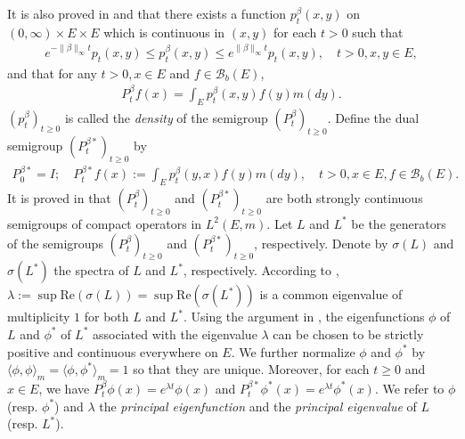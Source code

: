 \documentclass[12pt,a4paper]{amsart}
\theoremstyle{definition}
\numberwithin{equation}{section}
\begin{document}
It is also proved in \cite{RenSongZhang2015Limit} and \cite{RenSongZhang2017Central} that there exists a function $p^\beta_t(x,y)$ on $(0,\infty) \times E \times E$ which is continuous in $(x,y)$ for each $t>0$ such that 
\begin{align}
	e^{-\|\beta\|_\infty t} p_t(x,y)
	\leq p^{\beta}_t(x,y)
	\leq e^{\|\beta\|_\infty t} p_t(x,y),
	\quad t>0, x, y\in E,
\end{align}
and that for any $t>0, x\in E$ and $f \in \mathscr B_b(E)$,
\begin{align}
	P^\beta_t f(x)
	= \int_E p_t^\beta (x,y) f(y) m(dy).
\end{align}
$(p^\beta_t)_{t\geq 0}$ is called the
\emph{density}  of the semigroup $(P^\beta_t)_{t\geq 0}$.
Define the dual semigroup $(P^{\beta *}_t)_{t \geq 0}$ by
\begin{align}
	P^{\beta *}_0 = I;
	\quad P^{\beta *}_t f(x)
	:= \int_E p^\beta_t (y,x) f(y) m(dy),
	\quad t>0, x\in E, f\in \mathscr B_b(E).
\end{align}
It is proved in \cite{RenSongZhang2015Limit, RenSongZhang2017Central} that $(P^\beta_t)_{t \geq 0}$ and $(P^{\beta *}_t)_{t \geq 0}$ are both strongly continuous semigroups of compact operators in $L^2(E,m)$.
Let $L$ and $L^*$ be the generators of the semigroups $(P^\beta_t)_{t \geq 0}$ and $(P^{\beta *}_t)_{t \geq 0}$, respectively.
Denote by $\sigma(L)$ and $\sigma(L^*)$ the spectra of $L$ and $L^*$, respectively.
According to \cite[Theorem V.6.6]{Schaefer1974Banach}, $\lambda := \sup \text{Re}(\sigma(L)) = \sup \text{Re}(\sigma(L^*))$ is a common eigenvalue of multiplicity $1$ for both $L$ and $L^*$.
Using the argument in \cite{RenSongZhang2015Limit}, the eigenfunctions $\phi$ of $L$ and $\phi^*$ of $L^*$ associated with the eigenvalue $\lambda$ can be chosen to be strictly positive and continuous everywhere on $E$.
We further normalize $\phi$ and $\phi^*$ by $\langle\phi, \phi\rangle_m = \langle\phi,\phi^*\rangle_m = 1$ so that they are unique.
Moreover, for each $t\geq 0$ and $x\in E$, we have $P^\beta_t \phi(x) = e^{\lambda t} \phi(x)$ and $P^{\beta *}_t \phi^*(x) = e^{\lambda t} \phi^*(x)$.
We refer to $\phi$ (resp. $\phi^*$) and $\lambda$ the \emph{principal eigenfunction} and the \emph{principal eigenvalue} of $L$ (resp. $L^*$).
	
\end{document}
